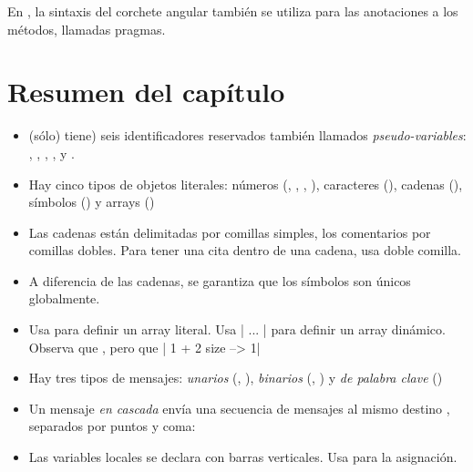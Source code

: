 \documentclass[a4paper,10pt,twoside]{book}
\begin{document}
En \pharo, la sintaxis del corchete angular también se utiliza para las anotaciones a los métodos, llamadas pragmas.

\section{Resumen del capítulo}

\begin{itemize}

\item	\pharo (sólo) tiene)  seis identificadores reservados también llamados \textit{pseudo-variables}: , , , ,  y .

\item	Hay cinco tipos de objetos literales: números (, , , ), caracteres (), cadenas (), símbolos () y arrays ()

\item	Las cadenas están delimitadas por comillas simples, los comentarios por comillas dobles.
		Para tener una cita dentro de una cadena, usa doble comilla.

\item	A diferencia de las cadenas, se garantiza que los símbolos son únicos globalmente.

\item	Usa  para definir un array literal.
		Usa \ct|{ ... }| para definir un array dinámico.
		Observa que
		, pero que
		\ct|{ 1 + 2 } size --> 1|

\item	Hay tres tipos de mensajes:
		\emph{unarios} (\eg {}, ),
		\emph{binarios} (\eg {}, ) y
		\emph{de palabra clave} (\eg {})

\item	Un mensaje \emph{en cascada} envía una secuencia de mensajes al mismo destino , separados por puntos y coma:

\item	Las variables locales se declara con barras verticales.
		Usa \ct{:=} para la asignación.


\end{itemize}
\end{document}
